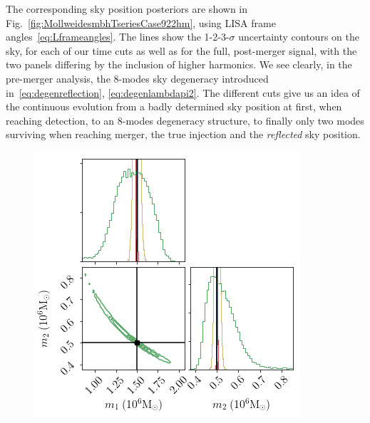 \documentclass[aps,showpacs,twocolumn,prd,superscriptaddress,nofootinbib]{revtex4-1}
\begin{document}
The corresponding sky position posteriors are shown in Fig.~\ref{fig:MollweidesmbhTseriesCase922hm}, using LISA frame angles~\ref{eq:Lframeangles}. The lines show the 1-2-3-$\sigma$ uncertainty contours on the sky, for each of our time cuts as well as for the full, post-merger signal, with the two panels differing by the inclusion of higher harmonics. We see clearly, in the pre-merger analysis, the 8-modes sky degeneracy introduced in~\eqref{eq:degenreflection}, \eqref{eq:degenlambdapi2}. The different cuts give us an idea of the continuous evolution from a badly determined sky position at first, when reaching detection, to an 8-modes degeneracy structure, to finally only two modes surviving when reaching merger, the true injection and the \textit{reflected} sky position. 

\begin{figure}
  \centering
  \begin{minipage}{.32\linewidth}
      \includegraphics[width=.99\linewidth]{../plots/corner_smbh_case9_hm_tseries_m1m2.png}
   \end{minipage}
   \begin{minipage}{.32\linewidth}

\end{minipage}
\end{figure}
\end{document}
